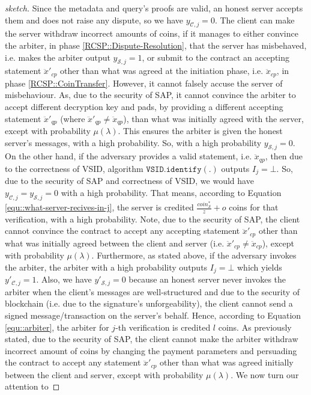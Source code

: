 \begin{proof}[sketch]
  Since the metadata and query's proofs are valid, an honest server accepts them and does not raise any dispute, so we have $y_{\scriptscriptstyle\mathcal{C},j}=0$.  The client can  make the server  withdraw incorrect amounts of coins, if it manages to either convince the arbiter, in phase \ref{RCSP::Dispute-Resolution}, that the server has misbehaved, i.e. makes the arbiter output $y_{\scriptscriptstyle\mathcal{S},j}=1$, or submit to the contract  an accepting  statement $\ddot{x}'_{\scriptscriptstyle cp}$ other than what was agreed at the initiation phase, i.e. $\ddot{x}_{\scriptscriptstyle cp}$, in phase \ref{RCSP::CoinTransfer}. However, it cannot falsely accuse the server of misbehaviour. As,  due to the security of SAP, it cannot  convince the arbiter to accept different decryption key and pads, by providing a different accepting statement $\ddot{x}'_{\scriptscriptstyle qp}$  (where $\ddot{x}'_{\scriptscriptstyle qp}\neq \ddot{x}_{\scriptscriptstyle qp}$), than what was initially agreed with the server, except with  probability $\mu(\lambda)$. This ensures   the arbiter is given the honest server's messages, with a high probability. So, with a high probability $y_{\scriptscriptstyle\mathcal{S},j}=0$. On the other hand, if the adversary provides a valid statement, i.e. $\ddot{x}_{\scriptscriptstyle qp}$, then due to the correctness of VSID, algorithm $\mathtt{VSID.identify}(.)$ outputs $I_{\scriptscriptstyle j}=\bot$. So, due to the security of SAP and correctness of VSID,  we would have $y_{\scriptscriptstyle\mathcal{C},j}=y_{\scriptscriptstyle\mathcal{S},j}=0$ with a high probability.  That means, according to  Equation \ref{equ::what-server-recives-in-j}, the server is credited $\frac{coin_{\scriptscriptstyle\mathcal S}^{\scriptscriptstyle*}}{z}+o$ coins for that verification, with a  high probability. Note,  due to the security of SAP, the client cannot convince the contract to accept any accepting statement $\ddot{x}'_{\scriptscriptstyle cp}$ other than what was initially agreed  between the client and server (i.e. $\ddot{x}'_{\scriptscriptstyle cp}\neq \ddot{x}_{\scriptscriptstyle cp}$), except with   probability $\mu(\lambda)$.  Furthermore, as stated above, if the adversary invokes the arbiter, the arbiter with a high probability outputs $I_{\scriptscriptstyle j}=\bot$ which yields  $y'_{\scriptscriptstyle\mathcal{C},j}=1$. Also, we have  $y'_{\scriptscriptstyle\mathcal{S},j}=0$ because an honest server never invokes the arbiter when the client's messages are well-structured and due to the security of blockchain (i.e. due to the signature's unforgeability), the client cannot send a signed message/transaction on the server's behalf.   Hence, according to Equation \ref{equ::arbiter}, the arbiter for $j$-th verification is credited $l$ coins.  As previously stated,  due to the security of SAP, the client cannot make the arbiter withdraw incorrect amount of coins by changing the payment parameters  and persuading the contract to accept any statement $\ddot{x}'_{\scriptscriptstyle cp}$ other than what was agreed initially between the client and server, except with  probability $\mu(\lambda)$. We now turn our attention to 
  

\end{proof}
